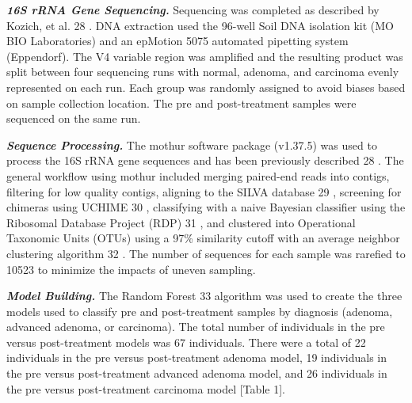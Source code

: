 \documentclass[12pt,]{article}
\providecommand{\DIFaddtex}[1]{{\protect\color{blue}\uwave{#1}}} %
\providecommand{\DIFaddbegin}{} %
\providecommand{\DIFaddend}{} %
\providecommand{\DIFdelbegin}{} %
\providecommand{\DIFdelend}{} %
\providecommand{\DIFadd}[1]{\texorpdfstring{\DIFaddtex{#1}}{#1}} %
\begin{document}
\textbf{\emph{16S rRNA Gene Sequencing.}} Sequencing was completed as
described by Kozich, et al. \DIFdelbegin %
\DIFdelend \DIFaddbegin \DIFadd{(}\DIFaddend 28\DIFdelbegin %
\DIFdelend \DIFaddbegin \DIFadd{)}\DIFaddend . DNA extraction used the 96-well Soil
DNA isolation kit (MO BIO Laboratories) and an epMotion 5075 automated
pipetting system (Eppendorf). The V4 variable region was amplified and
the resulting product was split between four sequencing runs with
normal, adenoma, and carcinoma evenly represented on each run. Each
group was randomly assigned to avoid biases based on sample collection
location. The pre and post-treatment samples were sequenced on the same
run.

\textbf{\emph{Sequence Processing.}} The mothur software package
(v1.37.5) was used to process the 16S rRNA gene sequences and has been
previously described \DIFdelbegin %
\DIFdelend \DIFaddbegin \DIFadd{(}\DIFaddend 28\DIFdelbegin %
\DIFdelend \DIFaddbegin \DIFadd{)}\DIFaddend . The general workflow using mothur included
merging paired-end reads into contigs, filtering for low quality
contigs, aligning to the SILVA database \DIFdelbegin %
\DIFdelend \DIFaddbegin \DIFadd{(}\DIFaddend 29\DIFdelbegin %
\DIFdelend \DIFaddbegin \DIFadd{)}\DIFaddend , screening for chimeras
using UCHIME \DIFdelbegin %
\DIFdelend \DIFaddbegin \DIFadd{(}\DIFaddend 30\DIFdelbegin %
\DIFdelend \DIFaddbegin \DIFadd{)}\DIFaddend , classifying with a naive Bayesian classifier using
the Ribosomal Database Project (RDP)\DIFdelbegin %
\DIFdelend \DIFaddbegin \DIFadd{(}\DIFaddend 31\DIFdelbegin %
\DIFdelend \DIFaddbegin \DIFadd{)}\DIFaddend , and clustered into Operational
Taxonomic Units (OTUs) using a 97\% similarity cutoff with an average
neighbor clustering algorithm \DIFdelbegin %
\DIFdelend \DIFaddbegin \DIFadd{(}\DIFaddend 32\DIFdelbegin %
\DIFdelend \DIFaddbegin \DIFadd{)}\DIFaddend . The number of sequences for each
sample was rarefied to 10523 to minimize the impacts of uneven sampling.

\textbf{\emph{Model Building.}} The Random Forest \DIFdelbegin %
\DIFdelend \DIFaddbegin \DIFadd{(}\DIFaddend 33\DIFdelbegin %
\DIFdelend \DIFaddbegin \DIFadd{) }\DIFaddend algorithm was
used to create the three models used to classify pre and post-treatment
samples by diagnosis (adenoma, advanced adenoma, or carcinoma). The
total number of individuals in the pre versus post-treatment models was
67 individuals. There were a total of 22 individuals in the pre versus
post-treatment adenoma model, 19 individuals in the pre versus
post-treatment advanced adenoma model, and 26 individuals in the pre
versus post-treatment carcinoma model {[}Table 1{]}.
\end{document}
